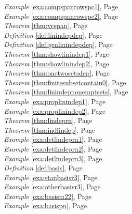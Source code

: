 \begin{multicols}{3}
\begin{center}
      \textit{Example} \ref{exa:compspanrowspc1}, Page \pageref{exa:compspanrowspc1} \\
      \textit{Example} \ref{exa:compspanrowspc2}, Page \pageref{exa:compspanrowspc2} \\
      \textit{Theorem} \ref{thm:vcspan}, Page \pageref{thm:vcspan} \\
      \textit{Definition} \ref{def:linindepdep}, Page \pageref{def:linindepdep} \\
      \textit{Definition} \ref{def:genlinindepdep}, Page \pageref{def:genlinindepdep} \\
      \textit{Theorem} \ref{thm:showlinindep1}, Page \pageref{thm:showlinindep1} \\
      \textit{Theorem} \ref{thm:showlinindep2}, Page \pageref{thm:showlinindep2} \\
      \textit{Theorem} \ref{thm:onetwosetsdep}, Page \pageref{thm:onetwosetsdep} \\
      \textit{Theorem} \ref{thm:finitesubsetcontain0}, Page \pageref{thm:finitesubsetcontain0} \\
      \textit{Theorem} \ref{thm:linindepnonemptsets}, Page \pageref{thm:linindepnonemptsets} \\
      \textit{Example} \ref{exa:proplinindep1}, Page \pageref{exa:proplinindep1} \\
      \textit{Example} \ref{exa:proplinindep2}, Page \pageref{exa:proplinindep2} \\
      \textit{Theorem} \ref{thm:lindeprn}, Page \pageref{thm:lindeprn} \\
      \textit{Theorem} \ref{thm:indlindep}, Page \pageref{thm:indlindep} \\
      \textit{Example} \ref{exa:detlindeprn1}, Page \pageref{exa:detlindeprn1} \\
      \textit{Example} \ref{exa:detlindeprn2}, Page \pageref{exa:detlindeprn2} \\
      \textit{Example} \ref{exa:detlindeprn3}, Page \pageref{exa:detlindeprn3} \\
      \textit{Definition} \ref{def:basis}, Page \pageref{def:basis} \\
      \textit{Example} \ref{exa:stanbasisr3}, Page \pageref{exa:stanbasisr3} \\
      \textit{Example} \ref{exa:otherbasisr3}, Page \pageref{exa:otherbasisr3} \\
      \textit{Example} \ref{exa:basism22}, Page \pageref{exa:basism22} \\
      \textit{Example} \ref{exa:basispn}, Page \pageref{exa:basispn} \\

\end{center}
\end{multicols}

